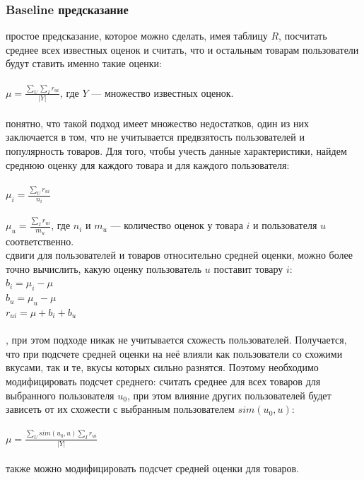 \documentclass{article}
\newcommand\tab[1][1cm]{\hspace*{#1}}
\begin{document}
\subsubsection{Baseline предсказание}
 простое предсказание, которое можно сделать, имея таблицу ﻿$R$﻿, посчитать среднее всех известных оценок и считать, что и остальным товарам пользователи будут ставить именно такие оценки:\\
\\
\tab$\mu=\frac{\sum_U{\sum_I{r_{ui}}}}{|Y|}$, где $Y$ — множество известных оценок.\\ 
\\
 понятно, что такой подход имеет множество недостатков, один из них заключается в том, что не учитывается предвзятость пользователей и популярность товаров. Для того, чтобы учесть данные характеристики, найдем среднюю оценку для каждого товара и для каждого пользователя:\\
\\
\tab$\mu_i=\frac{\sum_U{r_{ui}}}{n_i}$\\
\\
\tab$\mu_u=\frac{\sum_I{r_{ui}}}{m_u}$, где ${n_i}$ и ${m_u}$ — количество оценок у товара $i$﻿ и пользователя ﻿$u$ соответственно.\\
 сдвиги для пользователей и товаров относительно средней оценки, можно более точно вычислить, какую оценку пользователь ﻿$u$﻿ поставит товару $i$﻿﻿:\\
\tab$b_i=\mu_i-\mu$\\
\tab$b_u=\mu_u-\mu$\\
\tab$r_{ui}=\mu+b_i+b_u$\\
\\
, при этом подходе никак не учитывается схожесть пользователей. Получается, что при подсчете средней оценки на неё влияли как пользователи со схожими вкусами, так и те, вкусы которых сильно разнятся. Поэтому необходимо модифицировать подсчет среднего: считать среднее для всех товаров для выбранного пользователя ﻿$u_0$, при этом влияние других пользователей будет зависеть от их схожести с выбранным пользователем $sim(u_0,u)$:\\
\\
\tab$\mu=\frac{\sum_U{sim(u_0,u)}\sum_I{r_{ui}}}{|Y|}$\\
\\
 также можно модифицировать подсчет средней оценки для товаров.
\end{document}
